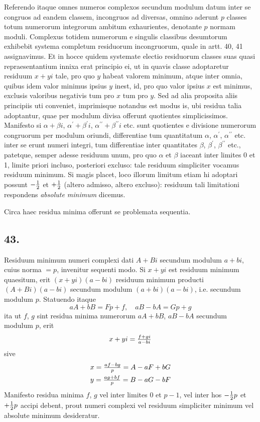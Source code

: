 \documentclass[twoside,12pt, showframe]{memoir}
\let\oldfrac\frac
\def\frac#1#2{\mathchoice{\tfrac{#1}{#2}}{\oldfrac{#1}{#2}}{\genfrac{}{}{}{2}{#1}{#2\mathstrut}}{\genfrac{}{}{}{3}{#1}{#2\mathstrut}}}
\begin{document}
Referendo itaque omnes numeros complexos secundum modulum datum inter se congruos ad eandem classem, incongruos ad diversas, omnino aderunt \(p\) classes totum numerorum integrorum ambitum exhaurientes, denotante \(p\) normam moduli. Complexus totidem numerorum e singulis classibus desumtorum exhibebit systema completum residuorum incongruorum, quale in artt. 40, 41 assignavimus. Et in hocce quidem systemate electio residuorum classes suas quasi repraesentantium innixa erat principio ei, ut in quavis classe adoptaretur residuum \(x+y i\) tale, pro quo \(y\) habeat valorem minimum, atque inter omnia, quibus idem valor minimus ipsius \(y\) inest, id, pro quo valor ipsius \(x\) est minimus, exclusis valoribus negativis tum pro \(x\) tum pro \(y\). Sed ad alia proposita aliis principiis uti conveniet, imprimisque notandus est modus is, ubi residua talia adoptantur, quae per modulum divisa offerunt quotientes simplicissimos. Manifesto si \(\alpha+\beta i\), \(\alpha^{\prime}+\beta^{\prime} i\), \(\alpha^{\prime \prime}+\beta^{\prime \prime} i\) etc. sunt quotientes e divisione numerorum congruorum per modulum oriundi, differentiae tum quantitatum \(\alpha\), \(\alpha^{\prime}\), \(\alpha^{\prime \prime}\) etc. inter se erunt numeri integri, tum differentiae inter quantitates \(\beta\), \(\beta^{\prime}\), \(\beta^{\prime \prime}\) etc., patetque, semper adesse residuum unum, pro quo \(\alpha\) et \(\beta\) iaceant inter limites \(0\) et 1, limite priori incluso, posteriori excluso: tale residuum simpliciter vocamus residuum minimum. Si magis placet, loco illorum limitum etiam hi adoptari possunt \(-\frac{1}{2}\) et \(+\frac{1}{2}\) (altero admisso, altero excluso): residuum tali limitationi respondens \textit{absolute minimum} dicemus.
 
Circa haec residua minima offerunt se problemata sequentia.

\subsection*{43.}
 
Residuum minimum numeri complexi dati \(A+B i\) secundum modulum \(a+b i\), cuius norma \(=p\), invenitur sequenti modo. Si \(x+y i\) est residuum minimum quaesitum, erit \((x+y i)(a-b i)\) residuum minimum producti \((A+B i)(a-b i)\) secundum modulum \((a+b i)(a-b i)\), i.e. secundum modulum \(p\). Statuendo itaque
\[a A+b B=F p+f, \quad a B-b A=G p+g\]
ita ut \(f\), \(g\) sint residua minima numerorum \(a A+b B\), \(a B-b A\) secundum modulum \(p\), erit\clearpage\noindent%
\[x+y i=\frac{f+g i}{a-b i}\]
sive
\[\begin{aligned}
& x=\frac{a f-b g}{p}=A-a F+b G \\
& y=\frac{a g+b f}{p}=B-a G-b F
\end{aligned}\]
Manifesto residua minima \(f\), \(g\) vel inter limites \(0\) et \(p-1\), vel inter hos \(-\frac{1}{2} p\) et \(+\frac{1}{2} p\) accipi debent, prout numeri complexi vel residuum simpliciter minimum vel absolute minimum desideratur.
\end{document}
